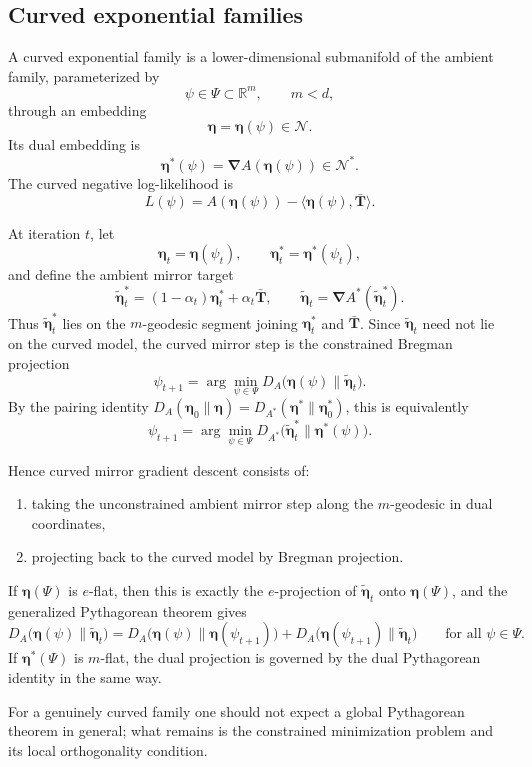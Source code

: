 \documentclass[11pt]{article}
\newcommand{\R}{\mathbb{R}}
\newcommand{\be}{{\bm{\eta}}}
\newcommand{\bT}{\bm{T}}
\newcommand{\bNabla}{\bm{\nabla}}
\begin{document}
\subsection{Curved exponential families}

A curved exponential family is a lower-dimensional submanifold of the ambient family, parameterized by
\[
\psi\in\Psi\subset\R^m,\qquad m<d,
\]
through an embedding
\[
\be=\be(\psi)\in\mathcal N.
\]
Its dual embedding is
\[
\be^\ast(\psi)=\bNabla A(\be(\psi))\in\mathcal N^\ast.
\]
The curved negative log-likelihood is
\[
L(\psi)=A(\be(\psi))-\langle \be(\psi),\bar{\bT}\rangle.
\]

At iteration \(t\), let
\[
\be_t=\be(\psi_t),
\qquad
\be_t^\ast=\be^\ast(\psi_t),
\]
and define the ambient mirror target
\[
\tilde{\be}_t^\ast
=
(1-\alpha_t)\be_t^\ast+\alpha_t\bar{\bT},
\qquad
\tilde{\be}_t=\bNabla A^\ast(\tilde{\be}_t^\ast).
\]
Thus \(\tilde{\be}_t^\ast\) lies on the \(m\)-geodesic segment joining \(\be_t^\ast\) and \(\bar{\bT}\). Since \(\tilde{\be}_t\) need not lie on the curved model, the curved mirror step is the constrained Bregman projection
\[
\boxed{
\psi_{t+1}
=
\arg\min_{\psi\in\Psi}
D_A\!\bigl(\be(\psi)\|\tilde{\be}_t\bigr).
}
\]
By the pairing identity \(D_A(\be_0\|\be)=D_{A^\ast}(\be^\ast\|\be_0^\ast)\), this is equivalently
\[
\boxed{
\psi_{t+1}
=
\arg\min_{\psi\in\Psi}
D_{A^\ast}\!\bigl(\tilde{\be}_t^\ast\|\be^\ast(\psi)\bigr).
}
\]

Hence curved mirror gradient descent consists of:
\begin{enumerate}[leftmargin=2em]
\item taking the unconstrained ambient mirror step along the \(m\)-geodesic in dual coordinates,
\item projecting back to the curved model by Bregman projection.
\end{enumerate}

If \(\be(\Psi)\) is \(e\)-flat, then this is exactly the \(e\)-projection of \(\tilde{\be}_t\) onto \(\be(\Psi)\), and the generalized Pythagorean theorem gives
\[
D_A\!\bigl(\be(\psi)\|\tilde{\be}_t\bigr)
=
D_A\!\bigl(\be(\psi)\|\be(\psi_{t+1})\bigr)
+
D_A\!\bigl(\be(\psi_{t+1})\|\tilde{\be}_t\bigr)
\qquad
\text{for all }\psi\in\Psi.
\]
If \(\be^\ast(\Psi)\) is \(m\)-flat, the dual projection is governed by the dual Pythagorean identity in the same way.

For a genuinely curved family one should not expect a global Pythagorean theorem in general; what remains is the constrained minimization problem and its local orthogonality condition.
\end{document}
